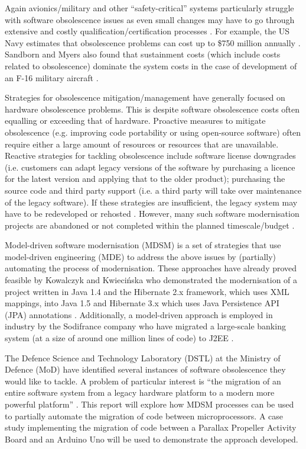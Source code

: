 \documentclass{UoYCSproject}
\begin{document}
Again avionics/military and other ``safety-critical'' systems particularly struggle with software obsolescence issues as even small changes may have to go through extensive and costly qualification/certification processes \parencite{singh2006obsolescence}. For example, the US Navy estimates that obsolescence problems can cost up to \$750 million annually \parencite{adams2005getting}. Sandborn and Myers also found that sustainment costs (which include costs related to obsolescence) dominate the system costs in the case of development of an F-16 military aircraft \parencite{sandborn2008designing}. 
 
Strategies for obsolescence mitigation/management have generally focused on hardware obsolescence problems. This is despite software obsolescence costs often equalling or exceeding that of hardware. Proactive measures to mitigate obsolescence (e.g. improving code portability or using open-source software) often require either a large amount of resources or resources that are unavailable. Reactive strategies for tackling obsolescence include software license downgrades (i.e. customers can adapt legacy versions of the software by purchasing a licence for the latest version and applying that to the older product); purchasing the source code and third party support (i.e. a third party will take over maintenance of the legacy software). If these strategies are insufficient, the legacy system may have to be redeveloped or rehosted \parencite{sandborn2007obsolescence}. However, many such software modernisation projects are abandoned or not completed within the planned timescale/budget \parencite{kowalczyk2009model}. 

Model-driven software modernisation (MDSM) is a set of strategies that use model-driven engineering (MDE) to address the above issues by (partially) automating the process of modernisation. These approaches have already proved feasible by Kowalczyk and Kwieci\'nska who demonstrated the modernisation of a project written in Java 1.4 and the Hibernate 2.x framework, which uses XML mappings, into Java 1.5 and Hibernate 3.x which uses Java Persistence API (JPA) annotations \parencite{kowalczyk2009model}. Additionally, a model-driven approach is employed in industry by the Sodifrance company who have migrated a large-scale banking system (at a size of around one million lines of code) to J2EE \parencite{fleurey2007model}.

The Defence Science and Technology Laboratory (DSTL) at the Ministry of Defence (MoD) have identified several instances of software obsolescence they would like to tackle. A problem of particular interest is ``the migration of an entire software system from a legacy hardware platform to a modern more powerful platform'' \parencite{gerasimou2017technical}. This report will explore how MDSM processes can be used to partially automate the migration of code between microprocessors. A case study implementing the migration of code between a Parallax Propeller Activity Board and an Arduino Uno will be used to demonstrate the approach developed.
 
\end{document}

